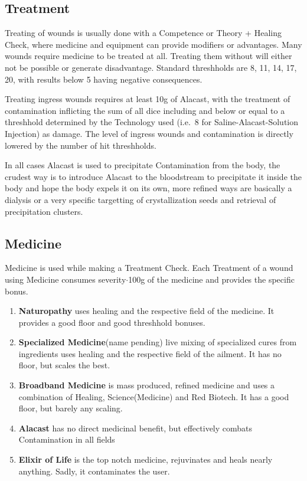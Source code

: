 \subsection{Treatment}\label{subsec:treatment}
Treating of wounds is usually done with a Competence or Theory + Healing Check, where medicine and equipment
can provide modifiers or advantages.
Many wounds require medicine to be treated at all.
Treating them without will either not be possible or generate disadvantage.
Standard threshholds are 8, 11, 14, 17, 20, with results below 5 having negative consequences.

Treating ingress wounds requires at least 10g of Alacast, with the treatment of
contamination inflicting the sum of all dice including and below or equal to a threshhold determined by the
Technology used (i.e.\ 8 for Saline-Alacast-Solution Injection) as damage.
The level of ingress wounds and contamination is directly lowered by the number of hit threshholds.

In all cases Alacast is used to precipitate Contamination from the body, the
crudest way is to introduce Alacast to the bloodstream to precipitate it inside the body and hope the body expels
it on its own, more refined ways are basically a dialysis or a very specific targetting of crystallization seeds
and retrieval of precipitation clusters.

\subsection{Medicine}\label{subsec:medicine}
Medicine is used while making a Treatment Check.
Each Treatment of a wound using Medicine consumes
severity\(\cdot\)100g of the medicine and provides the specific bonus.

\begin{enumerate}[label= -]
    \item \textbf{Naturopathy} uses healing and the respective field of the medicine.
    It provides a good floor and good threshhold bonuses.
    \item \textbf{Specialized Medicine}(name pending) live mixing of specialized cures from ingredients
    uses healing and the respective field of the ailment.
    It has no floor, but scales the best.
    \item \textbf{Broadband Medicine} is mass produced, refined medicine and uses a combination of
    Healing, Science(Medicine) and Red Biotech.
    It has a good floor, but barely any scaling.
    \item \textbf{Alacast} has no direct medicinal benefit, but effectively combats Contamination in all fields
    \item \textbf{Elixir of Life} is the top notch medicine, rejuvinates and heals nearly anything.
    Sadly, it contaminates the user.
\end{enumerate}

